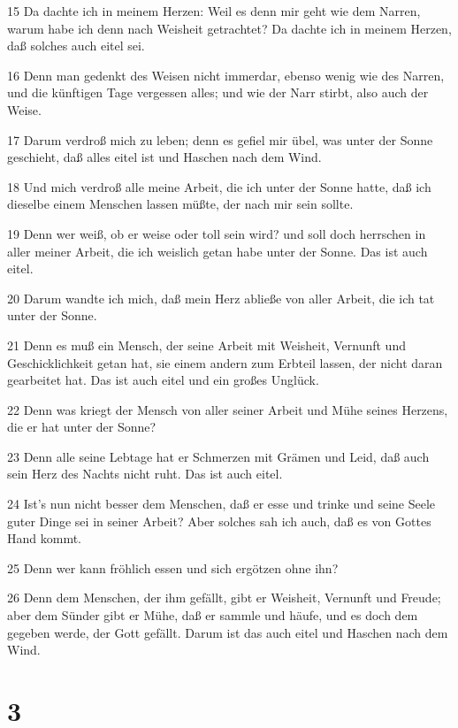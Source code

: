 \par 15 Da dachte ich in meinem Herzen: Weil es denn mir geht wie dem Narren, warum habe ich denn nach Weisheit getrachtet? Da dachte ich in meinem Herzen, daß solches auch eitel sei.
\par 16 Denn man gedenkt des Weisen nicht immerdar, ebenso wenig wie des Narren, und die künftigen Tage vergessen alles; und wie der Narr stirbt, also auch der Weise.
\par 17 Darum verdroß mich zu leben; denn es gefiel mir übel, was unter der Sonne geschieht, daß alles eitel ist und Haschen nach dem Wind.
\par 18 Und mich verdroß alle meine Arbeit, die ich unter der Sonne hatte, daß ich dieselbe einem Menschen lassen müßte, der nach mir sein sollte.
\par 19 Denn wer weiß, ob er weise oder toll sein wird? und soll doch herrschen in aller meiner Arbeit, die ich weislich getan habe unter der Sonne. Das ist auch eitel.
\par 20 Darum wandte ich mich, daß mein Herz abließe von aller Arbeit, die ich tat unter der Sonne.
\par 21 Denn es muß ein Mensch, der seine Arbeit mit Weisheit, Vernunft und Geschicklichkeit getan hat, sie einem andern zum Erbteil lassen, der nicht daran gearbeitet hat. Das ist auch eitel und ein großes Unglück.
\par 22 Denn was kriegt der Mensch von aller seiner Arbeit und Mühe seines Herzens, die er hat unter der Sonne?
\par 23 Denn alle seine Lebtage hat er Schmerzen mit Grämen und Leid, daß auch sein Herz des Nachts nicht ruht. Das ist auch eitel.
\par 24 Ist's nun nicht besser dem Menschen, daß er esse und trinke und seine Seele guter Dinge sei in seiner Arbeit? Aber solches sah ich auch, daß es von Gottes Hand kommt.
\par 25 Denn wer kann fröhlich essen und sich ergötzen ohne ihn?
\par 26 Denn dem Menschen, der ihm gefällt, gibt er Weisheit, Vernunft und Freude; aber dem Sünder gibt er Mühe, daß er sammle und häufe, und es doch dem gegeben werde, der Gott gefällt. Darum ist das auch eitel und Haschen nach dem Wind.

\chapter{3}

